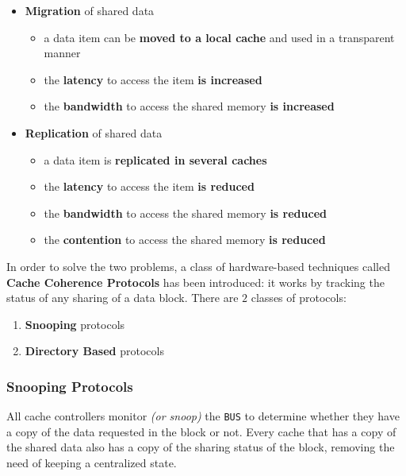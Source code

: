 \documentclass[english]{article}
\begin{document}
\begin{itemize}
  \item \textbf{Migration} of shared data
        \begin{itemize}
          \item a data item can be \textbf{moved to a local cache} and used in a transparent manner
          \item the \textbf{latency} to access the item \textbf{is increased}
          \item the \textbf{bandwidth} to access the shared memory \textbf{is increased}
        \end{itemize}
  \item \textbf{Replication} of shared data
        \begin{itemize}
          \item a data item is \textbf{replicated in several caches}
          \item the \textbf{latency} to access the item \textbf{is reduced}
          \item the \textbf{bandwidth} to access the shared memory \textbf{is reduced}
          \item the \textbf{contention} to access the shared memory \textbf{is reduced}
        \end{itemize}
\end{itemize}

In order to solve the two problems, a class of hardware-based techniques called \textbf{Cache Coherence Protocols} has been introduced:
it works by tracking the status of any sharing of a data block.
There are \(2\) classes of protocols:

\begin{enumerate}
  \item \textbf{Snooping} protocols
  \item \textbf{Directory Based} protocols
\end{enumerate}

\subsubsection{Snooping Protocols}

All cache controllers monitor \textit{(or snoop)} the \texttt{BUS} to determine whether they have a copy of the data requested in the block or not.
Every cache that has a copy of the shared data also has a copy of the sharing status of the block, removing the need of keeping a centralized state.
\end{document}
